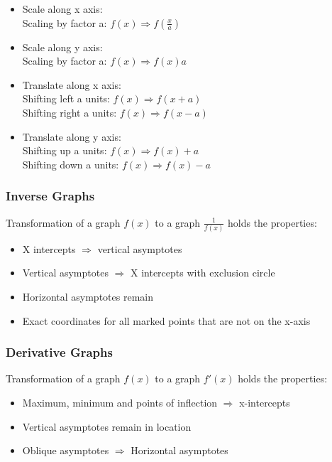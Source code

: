 \documentclass[../main]{subfiles}
\begin{document}
	\begin{itemize}
		\item Scale along x axis: \\
			Scaling by factor a: \( f(x) \Rightarrow f(\frac{x}{a}) \) 
		\item Scale along y axis: \\
			Scaling by factor a: \( f(x) \Rightarrow f(x)a \) 
		\item Translate along x axis: \\
			Shifting left a units: \( f(x) \Rightarrow f(x+a) \) \\
			Shifting right a units: \( f(x) \Rightarrow f(x-a) \)
		\item Translate along y axis:  \\
			Shifting up a units: \( f(x) \Rightarrow f(x)+a \) \\
			Shifting down a units: \( f(x) \Rightarrow f(x)-a \)
	\end{itemize}

	\subsubsection{Inverse Graphs}

	Transformation of a graph \(f(x)\) to a graph \(\frac{1}{f(x)}\) holds the properties:

	\begin{itemize}
		\item X intercepts \(\Rightarrow\) vertical asymptotes
		\item Vertical asymptotes \(\Rightarrow\) X intercepts with exclusion circle
		\item Horizontal asymptotes remain
		\item Exact coordinates for all marked points that are not on the x-axis 
	\end{itemize}

	\subsubsection{Derivative Graphs}

	Transformation of a graph \(f(x)\) to a graph \(f'(x)\) holds the properties:

	\begin{itemize}
		\item Maximum, minimum and points of inflection \(\Rightarrow\) x-intercepts
		\item Vertical asymptotes remain in location
		\item Oblique asymptotes \(\Rightarrow\) Horizontal asymptotes
	\end{itemize}
\end{document}
